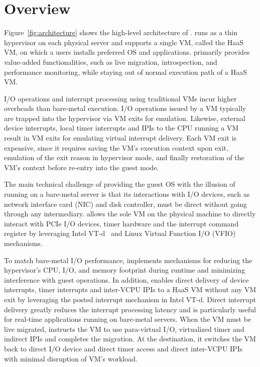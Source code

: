 \section{\na Overview}


Figure~\ref{fig:architecture} shows the high-level
architecture of \na. \na runs as a thin hypervisor on each
physical server and supports a single VM, called the HaaS VM,
on which a users installs preferred OS and applications. \na
primarily provides value-added functionalities, such as live
migration, introspection, and performance monitoring, while
staying out of normal execution path of a HaaS VM.

I/O operations and interrupt processing using traditional VMs
incur higher overheads than bare-metal execution. I/O
operations issued by a VM typically are trapped into the
hypervisor via VM exits for emulation. Likewise, external
device interrupts, local timer interrupts and IPIs to the CPU
running a VM result in VM exits for emulating virtual
interrupt delivery. Each VM exit is expensive, since it
requires saving the VM's execution context upon exit,
emulation of the exit reason in hypervisor mode, and finally
restoration of the VM's context before re-entry into the guest
mode.

The main technical challenge of providing the guest OS with
the illusion of running on a bare-metal server is that its
interactions with I/O devices, such as network interface card
(NIC) and disk controller, must be direct without going
through any intermediary. \na allows the sole VM on the
physical machine to directly interact with PCIe I/O devices,
timer hardware and the interrupt command register by
leveraging Intel VT-d~\cite{intelvtd-paper} and Linux Virtual
Function I/O (VFIO)~\cite{vfio} mechanisms.

To match bare-metal I/O performance, \na implements mechanisms
for reducing the hypervisor's CPU, I/O, and memory footprint
during runtime and minimizing interference with guest
operations. In addition, \na enables direct delivery of device
interrupts, timer interrupts and inter-VCPU IPIs to a HaaS VM
without any VM exit by leveraging the posted interrupt
mechanism in Intel VT-d. Direct interrupt delivery greatly
reduces the interrupt processing latency and is particularly
useful for real-time applications running on bare-metal
servers. When the VM must be live migrated, \na instructs the
VM to use para-virtual I/O, virtualized timer and indirect
IPIs and completes the migration. At the destination, it
switches the VM back to direct I/O device and direct timer
access and direct inter-VCPU IPIs with minimal disruption of
VM's workload.

